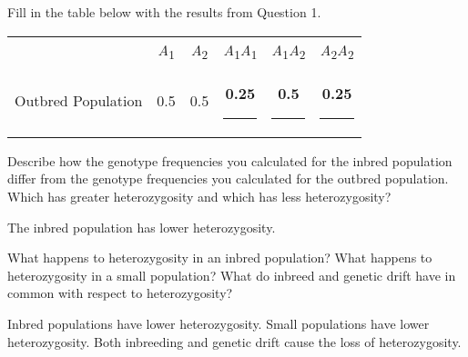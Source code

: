 \documentclass[11pt, addpoints]{exam}
\begin{document}
\begin{questions}

\question
Fill in the table below with the results from Question 1.

{\large
\begin{longtable}[c]{@{}lccccc@{}}
\toprule
& \emph{A}\textsubscript{1} &%
 \emph{A}\textsubscript{2} &%
 \emph{A}\textsubscript{1}\emph{A}\textsubscript{1} &%
 \emph{A}\textsubscript{1}\emph{A}\textsubscript{2} &%
 \emph{A}\textsubscript{2}\emph{A}\textsubscript{2} \\[0.35cm]
 Outbred Population &%
 	0.5 &%
	0.5 &%
	\ifprintanswers\textbf{0.25}\else\rule{0.5in}{0.4pt}\fi &%
	\ifprintanswers\textbf{0.5}\else\rule{0.5in}{0.4pt}\fi &%
	\ifprintanswers\textbf{0.25}\else\rule{0.5in}{0.4pt}\fi \tabularnewline
\bottomrule
\end{longtable}
}%

\question[2]
Describe how the genotype frequencies you calculated for
the inbred population differ from the genotype frequencies you calculated for
the outbred population. Which has greater heterozygosity and which has less heterozygosity?

\begin{minipage}[t][1.5in]{\textwidth}%
\begin{solution}
The inbred population has lower heterozygosity.
\end{solution}
\end{minipage}

\question[1]
What happens to heterozygosity in an inbred population? What happens to heterozygosity in a small population? What do inbreed and genetic drift have in common with respect to heterozygosity?

\begin{minipage}[t][1.5in]{\textwidth}%
\begin{solution}
Inbred populations have lower heterozygosity. Small populations have lower heterozygosity. Both inbreeding and genetic drift cause the loss of heterozygosity.
\end{solution}
\end{minipage}


\newpage


\end{questions}
\end{document}
